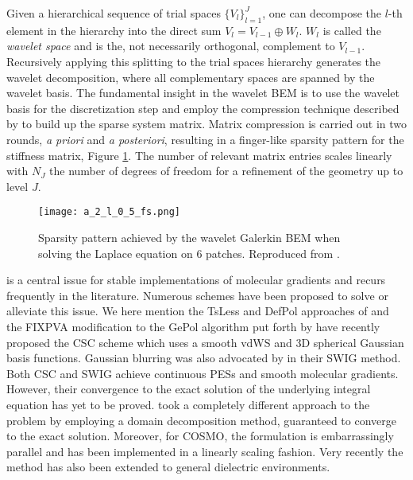 Given a hierarchical sequence of trial spaces
$\lbrace V_l\rbrace_{l=1}^J$, one can decompose the $l$-th element in
the hierarchy into the direct sum $V_l = V_{l-1} \oplus W_l$.
$W_l$ is called the \emph{wavelet space} and is the, not necessarily
orthogonal, complement to $V_{l-1}$.
Recursively applying this splitting to the trial spaces hierarchy
generates the wavelet decomposition, where all complementary spaces are
spanned by the wavelet basis.
The fundamental insight in the wavelet \acrshort{BEM} is to use the wavelet
basis for the discretization step and employ the compression technique
described by \citeauthor{Dahmen2006-pj} to build up the sparse system
matrix.\autocite{Harbrecht2004-uo, Harbrecht2006-ug, Dahmen2006-pj}
Matrix compression is carried out in two rounds, \emph{a priori} and \emph{a
posteriori}, resulting in a finger-like sparsity pattern for the
stiffness matrix, Figure \ref{fig:finger-structure}.
The number of relevant matrix entries scales linearly
with $N_J$ the number of degrees of freedom for a refinement of the
geometry up to level $J$.

\begin{figure}[tb]
   \texttt{[image: a\_2\_l\_0\_5\_fs.png]}
   \caption[Sparsity pattern achieved by the wavelet Galerkin \acrshort{BEM}.]{
   Sparsity pattern achieved by the wavelet Galerkin \acrshort{BEM} when
   solving the Laplace equation on 6 patches.
   Reproduced from .
   }
   \label{fig:finger-structure}
\end{figure}

 is a
central issue for stable implementations of molecular gradients and
recurs frequently in the literature.
Numerous schemes have been proposed to solve or alleviate this issue.
We here mention the TsLess\autocite{Pomelli2004-lb} and
DefPol\autocite{Pomelli1998-ob, Pomelli1999-dc} approaches of
\citeauthor{Pomelli1998-ob} and the FIXPVA
modification\autocite{Su2009-em} to the GePol algorithm put forth by
\citeauthor{Su2009-em}
\citeauthor{Scalmani2010-tw} have recently proposed the \gls{CSC} scheme
which uses a smooth \acrshort{vdWS} and 3D spherical Gaussian basis
functions.\autocite{Scalmani2010-tw, York1999-xy}
Gaussian blurring was also advocated by \citeauthor{Lange2010-jp} in
their \gls{SWIG} method.\autocite{Lange2010-jp, Lange2010-qo}
Both \acrshort{CSC} and \acrshort{SWIG} achieve continuous \acsp{PES} and smooth
molecular gradients. However, their convergence to the exact solution of
the underlying integral equation has yet to be
proved.\autocite{Ern2004-oo}
\citeauthor{Cances2013-jg} took
a completely different approach to the problem
by employing a domain decomposition
method, guaranteed to converge to the exact solution.\autocite{Quarteroni1999-jt}
Moreover, for \acrshort{COSMO}, the formulation is embarrassingly
parallel and has been implemented in a linearly scaling fashion.\autocite{Cances2013-jg, Lipparini2013-cy, Lipparini2014-to,
Lipparini2014-fq}
Very recently the method has also been extended to general dielectric
environments.\autocite{Stamm2016-fv}

